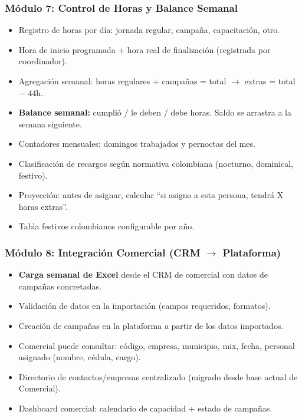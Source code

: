 \documentclass[10pt,a4paper]{article}
\begin{document}
\subsubsection{M\'{o}dulo 7: Control de Horas y Balance Semanal}
\begin{itemize}[leftmargin=2em]
    \item Registro de horas por d\'{i}a: jornada regular, campaña, capacitaci\'{o}n, otro.
    \item Hora de inicio programada + hora real de finalizaci\'{o}n (registrada por coordinador).
    \item Agregaci\'{o}n semanal: horas regulares + campañas = total $\rightarrow$ extras = total $-$ 44h.
    \item \textbf{Balance semanal:} cumpli\'{o} / le deben / debe horas. Saldo se arrastra a la semana siguiente.
    \item Contadores mensuales: domingos trabajados y pernoctas del mes.
    \item Clasificaci\'{o}n de recargos seg\'{u}n normativa colombiana (nocturno, dominical, festivo).
    \item Proyecci\'{o}n: antes de asignar, calcular ``si asigno a esta persona, tendr\'{a} X horas extras''.
    \item Tabla festivos colombianos configurable por año.
\end{itemize}

\subsubsection{M\'{o}dulo 8: Integraci\'{o}n Comercial (CRM $\rightarrow$ Plataforma)}
\begin{itemize}[leftmargin=2em]
    \item \textbf{Carga semanal de Excel} desde el CRM de comercial con datos de campañas concretadas.
    \item Validaci\'{o}n de datos en la importaci\'{o}n (campos requeridos, formatos).
    \item Creaci\'{o}n de campañas en la plataforma a partir de los datos importados.
    \item Comercial puede consultar: c\'{o}digo, empresa, municipio, mix, fecha, personal asignado (nombre, c\'{e}dula, cargo).
    \item Directorio de contactos/empresas centralizado (migrado desde base actual de Comercial).
    \item Dashboard comercial: calendario de capacidad + estado de campañas.
\end{itemize}
\end{document}
